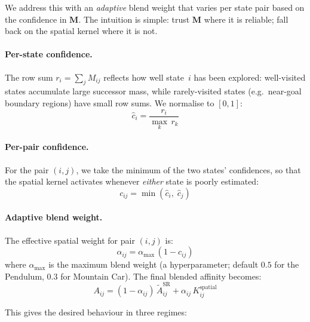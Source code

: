 We address this with an \emph{adaptive} blend weight that varies per
state pair based on the confidence in $\mathbf{M}$.  The intuition is
simple: trust $\mathbf{M}$ where it is reliable; fall back on the spatial
kernel where it is not.

\paragraph{Per-state confidence.}
The row sum $r_i = \sum_j M_{ij}$ reflects how well state~$i$ has been
explored: well-visited states accumulate large successor mass, while
rarely-visited states (e.g.\ near-goal boundary regions) have small row
sums.  We normalise to $[0,1]$:
\begin{equation}
\hat{c}_i = \frac{r_i}{\max_k\, r_k}
\end{equation}

\paragraph{Per-pair confidence.}
For the pair $(i,j)$, we take the minimum of the two states'
confidences, so that the spatial kernel activates whenever \emph{either}
state is poorly estimated:
\begin{equation}
c_{ij} = \min\!\left(\hat{c}_i,\;\hat{c}_j\right)
\end{equation}

\paragraph{Adaptive blend weight.}
The effective spatial weight for pair $(i,j)$ is:
\begin{equation}
\alpha_{ij} = \alpha_{\max}\,(1 - c_{ij})
\end{equation}
where $\alpha_{\max}$ is the maximum blend weight (a hyperparameter;
default $0.5$ for the Pendulum, $0.3$ for Mountain Car).  The final
blended affinity becomes:
\begin{equation}
\boxed{A_{ij} = (1 - \alpha_{ij})\,\widetilde{A}^{\text{SR}}_{ij} + \alpha_{ij}\,K^{\text{spatial}}_{ij}}
\end{equation}

This gives the desired behaviour in three regimes:

